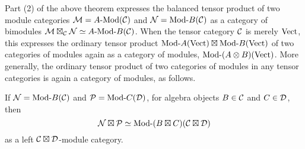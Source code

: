 \documentclass{amsart}
\begin{document}
Part (2) of the above theorem expresses the balanced tensor product of two module categories $\cM = \Mod{A}{}(\cC)$ and $\cN = \Mod{}{B}(\cC)$ as a category of bimodules $\cM \boxtimes_\cC \cN \simeq \Mod{A}{B}(\cC)$.  When the tensor category $\mathcal C$ is merely $\mathrm{Vect}$, this expresses the ordinary tensor product $\Mod{}{A}(\Vect) \boxtimes \Mod{}{B}(\Vect)$ of two categories of modules again as a category of modules, $\Mod{}{(A \otimes B)}(\Vect)$.  More generally, the ordinary tensor product of two categories of modules in any tensor categories is again a category of modules, as follows.

\begin{proposition}
	If $\cN = \Mod{}{B}(\cC)$ and $\cP = \Mod{}{C}(\cD)$, for algebra objects $B \in \mathcal C$ and $C \in \mathcal D$, then $$\cN \boxtimes \cP \simeq \Mod{}{(B \boxtimes C)}(\cC \boxtimes \cD)$$ as a left $\mathcal C \boxtimes \mathcal D$-module category.
\end{proposition}
\end{document}
